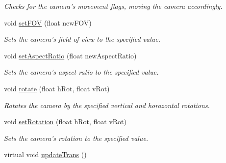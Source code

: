 \begin{DoxyCompactItemize}
\begin{DoxyCompactList}\small\item\em Checks for the camera's movement flags, moving the camera accordingly. \end{DoxyCompactList}\item 
void \hyperlink{class_camera_a3cb5734686d002f2d2e225c5b3daa8bc}{set\-F\-O\-V} (float new\-F\-O\-V)
\begin{DoxyCompactList}\small\item\em Sets the camera's field of view to the specified value. \end{DoxyCompactList}\item 
void \hyperlink{class_camera_a2fd7432c0256ad790097b87c018c4b3f}{set\-Aspect\-Ratio} (float new\-Aspect\-Ratio)
\begin{DoxyCompactList}\small\item\em Sets the camera's aspect ratio to the specified value. \end{DoxyCompactList}\item 
void \hyperlink{class_camera_ad28025de4feea3b56deb9c7758880c10}{rotate} (float h\-Rot, float v\-Rot)
\begin{DoxyCompactList}\small\item\em Rotates the camera by the specified vertical and horozontal rotations. \end{DoxyCompactList}\item 
void \hyperlink{class_camera_a3205c652163c9b42ea3f5d0f3b21798f}{set\-Rotation} (float h\-Rot, float v\-Rot)
\begin{DoxyCompactList}\small\item\em Sets the camera's rotation to the specified value. \end{DoxyCompactList}\item 
\hypertarget{class_camera_aa0ed3b899f6c58167501c2317d70c8f5}{virtual void \hyperlink{class_camera_aa0ed3b899f6c58167501c2317d70c8f5}{update\-Trans} ()}\label{class_camera_aa0ed3b899f6c58167501c2317d70c8f5}


\end{DoxyCompactItemize}
